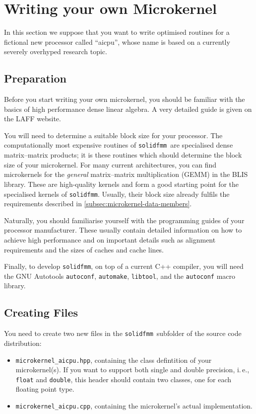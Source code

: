 \documentclass{scrbook}
\newcommand{\solidfmm}{\texttt{solidfmm}}
\begin{document}
\section{Writing your own Microkernel}
In this section we suppose that you want to write optimised routines for
a fictional new processor called \enquote{aicpu}, whose name is based on a
currently severely overhyped research topic. 

\subsection{Preparation}
Before you start writing your own microkernel, you should be familiar with
the basics of high performance dense linear algebra. A very detailed guide
is given on the LAFF website.\autocite{laffproject}

You will need to determine a suitable block size for your processor. The
computationally most expensive routines of \solidfmm\ are specialised dense
matrix--matrix products; it is these routines which should determine the block
size of your microkernel. For many current architectures, you can find
microkernels for the \emph{general} matrix--matrix multiplication (GEMM) in the
BLIS library.\autocite{blisproject} These are high-quality kernels and form
a good starting point for the specialised kernels of \solidfmm. Usually, their
block size already fulfils the requirements described in
\cref{subsec:microkernel-data-members}.

Naturally, you should familiarise yourself with the programming guides of your
processor manufacturer. These usually contain detailed information on how to
achieve high performance and on important details such as alignment
requirements and the sizes of caches and cache lines.

Finally, to develop \solidfmm, on top of a current C++ compiler, you will need
the GNU Autotools \lstinline|autoconf|, \lstinline|automake|,
\lstinline|libtool|, and the \lstinline|autoconf| macro library. 

\subsection{Creating Files}
You need to create two new files in the \solidfmm\ subfolder of the source code
distribution:
\begin{itemize}
\item\lstinline|microkernel_aicpu.hpp|, containing the class defintition of
your microkernel(s). If you want to support both single and double precision,
i.\,e., \lstinline[style=cpp]|float| and \lstinline[style=cpp]|double|,
this header should contain two classes, one for each floating point type.
\item\lstinline|microkernel_aicpu.cpp|, containing the microkernel's actual
implementation.
\end{itemize}
\end{document}
